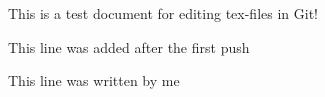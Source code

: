 \documentclass[10pt,conference]{IEEEtran}
\begin{document}
This is a test document for editing tex-files in Git!

This line was added after the first push

This line was written by me
\end{document}
